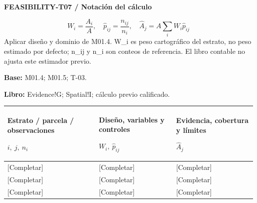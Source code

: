 \par\begingroup\sffamily\fontsize{8}{10}\selectfont\color{NEBGreen}\setlength{\parskip}{2pt}\setlength{\abovedisplayskip}{4pt}\setlength{\belowdisplayskip}{4pt}\setlength{\abovedisplayshortskip}{2pt}\setlength{\belowdisplayshortskip}{3pt}
\textbf{FEASIBILITY-T07 / Notación del cálculo}\par
{\fontsize{9}{11}\selectfont\[ W_i=\frac{A_i}{A},\quad \widehat p_{ij}=\frac{n_{ij}}{n_i},\quad \widehat A_j=A\sum_i W_i\widehat p_{ij} \]}
Aplicar diseño y dominio de M01.4. W\_i es peso cartográfico del estrato, no peso estimado por defecto; n\_ij y n\_i son conteos de referencia. El libro contable no ajusta este estimador previo.\par
\textbf{Base:} M01.4; M01.5; T-03.\par
\textbf{Libro:} Evidence!G; Spatial!I; cálculo previo calificado.\par\endgroup
{\sffamily\fontsize{8.3}{10.3}\selectfont\begin{longtable}{@{}P{52.79mm} P{59.39mm} P{52.79mm}@{}}
\toprule
\textbf{Estrato / parcela / observaciones}\par {\normalfont\fontsize{8.2}{10}\selectfont $i,\ j,\ n_i$} & \textbf{Diseño, variables y controles}\par {\normalfont\fontsize{8.2}{10}\selectfont $W_i,\ \widehat p_{ij}$} & \textbf{Evidencia, cobertura y límites}\par {\normalfont\fontsize{8.2}{10}\selectfont $\widehat A_j$}\\\midrule\endhead
\rule{0pt}{7.7mm}[Completar] & [Completar] & [Completar]\\\hline
\rule{0pt}{7.7mm}[Completar] & [Completar] & [Completar]\\\hline
\rule{0pt}{7.7mm}[Completar] & [Completar] & [Completar]\\\hline
\end{longtable}}
\par\begingroup\sffamily\fontsize{8}{10}\selectfont\color{NEBGreen}\setlength{\parskip}{2pt}\setlength{\abovedisplayskip}{4pt}\setlength{\belowdisplayskip}{4pt}\setlength{\abovedisplayshortskip}{2pt}\setlength{\belowdisplayshortskip}{3pt}
